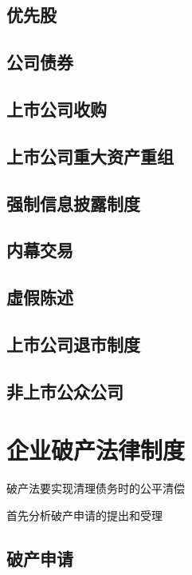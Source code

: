 \documentclass[UTF8,12pt]{ctexart}
\numberwithin{equation}{section} %
\numberwithin{figure}{section}
\numberwithin{table}{section}
\begin{document}
	\subsection{优先股}
	
	\subsection{公司债券}
	
	\subsection{上市公司收购}
	
	\subsection{上市公司重大资产重组}
	
	\subsection{强制信息披露制度}
	
	\subsection{内幕交易}
	
	\subsection{虛假陈述}
	
	\subsection{上市公司退市制度}
	
	\subsection{非上市公众公司}

	
	\newpage
	\section{企业破产法律制度}
	破产法要实现清理债务时的公平清偿
	
	首先分析破产申请的提出和受理
	
	\subsection{破产申请}
	
\end{document}
